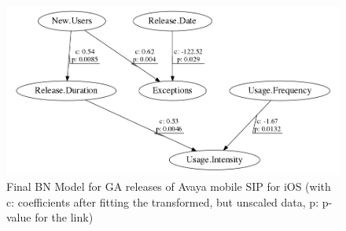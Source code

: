 \documentclass[smallextended]{svjour3}       %
\begin{document}
\begin{figure}[!t]
\centering
\includegraphics[width=0.7\linewidth]{i}%
\caption{Final BN Model for GA releases of Avaya mobile SIP for iOS (with c: coefficients after fitting the transformed, but unscaled data, p: p-value  for the link) }
\label{fig:finalI}
\vspace{-10pt}
\end{figure}
\end{document}
